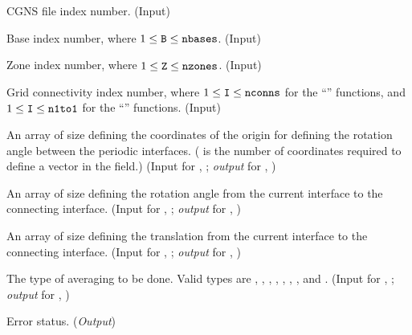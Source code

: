 \begin{Ventryi}{}\raggedright
\item [\fort{fn}]
      CGNS file index number.
      (\textcolor{input}{Input})
\item [\fort{B}]
      Base index number, where $1 \leq \text{{\normalfont\texttt{B}}} \leq \text{{\normalfont\texttt{nbases}}}$.
      (\textcolor{input}{Input})
\item [\fort{Z}]
      Zone index number, where $1 \leq \text{{\normalfont\texttt{Z}}} \leq \text{{\normalfont\texttt{nzones}}}$.
      (\textcolor{input}{Input})
\item [\fort{I}]
      Grid connectivity index number, where
      $1 \leq \text{{\normalfont\texttt{I}}} \leq \text{{\normalfont\texttt{nconns}}}$
      for the ``'' functions, and
      $1 \leq \text{{\normalfont\texttt{I}}} \leq \text{{\normalfont\texttt{n1to1}}}$
      for the ``'' functions.
      (\textcolor{input}{Input})
\item [\fort{RotationCenter}]
      An array of size  defining the coordinates of
      the origin for defining the rotation angle between the periodic
      interfaces.
      ( is the number of coordinates required to define
      a vector in the field.)
      (\textcolor{input}{Input} for ,
      ;
      \textcolor{output}{\textit{output}} for ,
      )
\item [\fort{RotationAngle}]
      An array of size  defining the rotation angle from
      the current interface to the connecting interface.
      (\textcolor{input}{Input} for ,
      ;
      \textcolor{output}{\textit{output}} for ,
      )
\item [\fort{Translation}]
      An array of size  defining the translation from
      the current interface to the connecting interface.
      (\textcolor{input}{Input} for ,
      ;
      \textcolor{output}{\textit{output}} for ,
      )
\item [\fort{AverageInterfaceType}]
      The type of averaging to be done.
      Valid types are , , ,
      , , ,
      , and .
      (\textcolor{input}{Input} for ,
      ;
      \textcolor{output}{\textit{output}} for ,
      )
\item [\fort{ier}]
      Error status.
      (\textcolor{output}{\textit{Output}})
\end{Ventryi}

